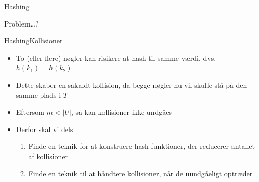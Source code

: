 \documentclass[aspectratio=1610]{beamer}
\begin{document}
\begin{frame}{Hashing}{}
    \begin{center}
        Problem\ldots?
    \end{center}
\end{frame}


\begin{frame}{Hashing}{Kollisioner}
    \begin{itemize}[<+->]
        \item To (eller flere) nøgler kan risikere at hash til samme værdi,
            dvs.\ $h(k_1) = h(k_2)$
        \item Dette skaber en såkaldt \alert{kollision}, da begge nøgler nu vil
            skulle stå på den samme plads i $T$
        \item Eftersom $m < |U|$, så kan kollisioner ikke undgåes
        \item Derfor skal vi dels
            \begin{enumerate}
                \item Finde en teknik for at konstruere hash-funktioner, der
                    reducerer antallet af kollisioner
                \item Finde en teknik til at håndtere kollisioner, når de
                    uundgåeligt optræder
            \end{enumerate}
    \end{itemize}
\end{frame}
\end{document}
